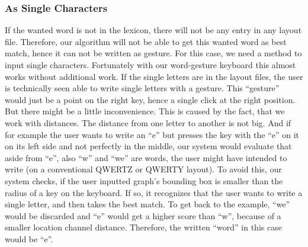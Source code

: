 \subsubsection{As Single Characters}
If the wanted word is not in the lexicon, there will not be any entry in any layout file. Therefore, our algorithm will not be able to get this wanted word as best match, hence it can not be written as gesture. For this case, we need a method to input single characters. Fortunately with our word-gesture keyboard this almost works without additional work. If the single letters are in the layout files, the user is technically seen able to write single letters with a gesture. This ``gesture'' would just be a point on the right key, hence a single click at the right position. But there might be a little inconvenience. This is caused by the fact, that we work with distances. The distance from one letter to another is not big. And if for example the user wants to write an ``e'' but presses the key with the ``e'' on it on its left side and not perfectly in the middle, our system would evaluate that aside from ``e'', also ``w'' and ``we'' are words, the user might have intended to write (on a conventional QWERTZ or QWERTY layout). To avoid this, our system checks, if the user inputted graph's bounding box is smaller than the radius of a key on the keyboard. If so, it recognizes that the user wants to write a single letter, and then takes the best match. To get back to the example, ``we'' would be discarded and ``e'' would get a higher score than ``w'', because of a smaller location channel distance. Therefore, the written ``word'' in this case would be ``e''.

